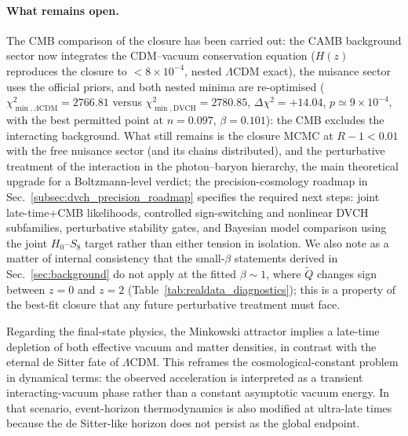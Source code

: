 \documentclass[pdflatex,sn-mathphys-num]{sn-jnl}%
\begin{document}
\paragraph*{What remains open.}\quad The CMB comparison of the closure has
been carried out: the CAMB background sector now integrates the
CDM--vacuum conservation equation ($H(z)$ reproduces the closure to
$<8\times10^{-4}$, nested $\Lambda$CDM exact), the nuisance sector uses
the official priors, and both nested minima are re-optimised
($\chi^2_{\min,\Lambda\mathrm{CDM}}=2766.81$ versus
$\chi^2_{\min,\mathrm{DVCH}}=2780.85$, $\Delta\chi^2=+14.04$,
$p\simeq9\times10^{-4}$, with the best permitted point at $n=0.097$,
$\beta=0.101$): the CMB excludes the interacting background. What still
remains is the closure MCMC at $R-1<0.01$ with the free nuisance sector
(and its chains distributed), and
the perturbative treatment of the interaction in the photon--baryon
hierarchy, the main theoretical upgrade for a Boltzmann-level verdict;
the precision-cosmology roadmap in
Sec.~\ref{subsec:dvch_precision_roadmap} specifies the required next steps:
joint late-time$+$CMB likelihoods, controlled sign-switching and nonlinear
DVCH subfamilies, perturbative stability gates, and Bayesian model
comparison using the joint $H_0$--$S_8$ target rather than either tension
in isolation. We also note as a matter of internal consistency that the
small-$\beta$ statements derived in Sec.~\ref{sec:background} do not apply
at the fitted $\beta\sim1$, where $\widetilde Q$ changes sign between
$z=0$ and $z=2$ (Table~\ref{tab:realdata_diagnostics}); this is a property
of the best-fit closure that any future perturbative treatment must face.

Regarding the final-state physics, the Minkowski attractor implies a late-time
depletion of both effective vacuum and matter densities, in contrast with the
eternal de Sitter fate of $\Lambda$CDM. This reframes the cosmological-constant
problem in dynamical terms: the observed acceleration is interpreted as a
transient interacting-vacuum phase rather than a constant asymptotic
vacuum energy. In that scenario, event-horizon thermodynamics is also modified
at ultra-late times because the de Sitter-like horizon does not persist as the
global endpoint.
\end{document}
